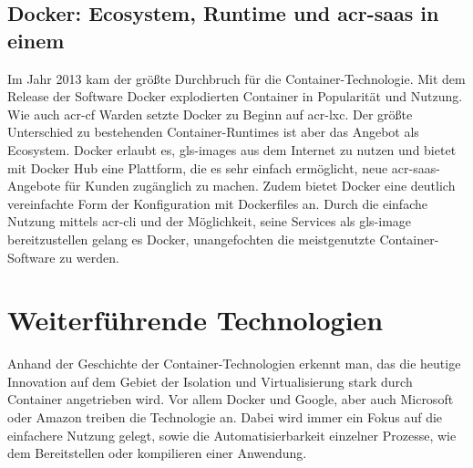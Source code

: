 \subsection{Docker: Ecosystem, Runtime und \gls{acr-saas} in einem}
\label{sec:geschichteDocker}
Im Jahr 2013 kam der größte Durchbruch für die Container-Technologie. Mit dem Release der Software Docker explodierten Container in Popularität und Nutzung. Wie auch \gls{acr-cf} Warden setzte Docker zu Beginn auf \gls{acr-lxc}. Der größte Unterschied zu bestehenden Container-Runtimes ist aber das Angebot als Ecosystem. Docker erlaubt es, \glspl{gls-image} aus dem Internet zu nutzen und bietet mit Docker Hub eine Plattform, die es sehr einfach ermöglicht, neue \gls{acr-saas}-Angebote für Kunden zugänglich zu machen. Zudem bietet Docker eine deutlich vereinfachte Form der Konfiguration mit Dockerfiles an. Durch die einfache Nutzung mittels \gls{acr-cli} und der Möglichkeit, seine Services als \gls{gls-image} bereitzustellen gelang es Docker, unangefochten die meistgenutzte Container-Software zu werden.

\section{Weiterführende Technologien}
\label{sec:timeline}
Anhand der Geschichte der Container-Technologien erkennt man, das die heutige Innovation auf dem Gebiet der Isolation und Virtualisierung stark durch Container angetrieben wird. Vor allem Docker und Google, aber auch Microsoft oder Amazon treiben die Technologie an. Dabei wird immer ein Fokus auf die einfachere Nutzung gelegt, sowie die Automatisierbarkeit einzelner Prozesse, wie dem Bereitstellen oder kompilieren einer Anwendung.

